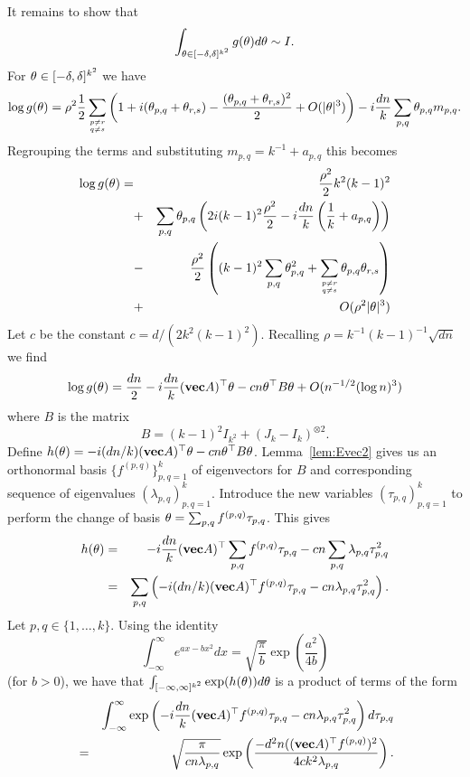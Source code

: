 \documentclass[12pt]{article}
\newcommand{\lab}[1]{\label{#1}}
\def\be{\begin{equation}}
\def\ee{\end{equation}}
\newcommand{\bel}[1]{\be\lab{#1}}
\def\transpose{\top}
\def\mvec{{\bf vec}}
\def\vtheta{{\bf \theta}}
\begin{document}
It remains to show that 
\[
\int_{\vtheta\in [-\delta,\delta]^{k^2}} g(\vtheta) d\vtheta \sim I.
\]
For $\vtheta\in[-\delta,\delta]^{k^2}$ we have
\[
\log g(\vtheta) 
=
\rho^2
\frac{1}{2}
\sum_{p\ne r \atop q\ne s}
\left( 1 + i(\theta_{p,q}+\theta_{r,s}) - \frac{(\theta_{p,q}+\theta_{r,s})^2}{2} + O(|\theta|^3) \right)
- i\frac{dn}{k}\sum_{p,q}\theta_{p,q}m_{p,q}.
\]
Regrouping the terms and substituting $m_{p,q}=k^{-1}+a_{p,q}$ 
this becomes
\begin{eqnarray*}
\log g(\vtheta) 
=&&
\frac{\rho^2}{2}k^2(k-1)^2\\
&+&\sum_{p,q}\theta_{p,q}\left(2i(k-1)^2\frac{\rho^2}{2}-i\frac{dn}{k}\left(\frac{1}{k}+a_{p,q}\right)\right) \\
&-&\frac{\rho^2}{2}\left((k-1)^2\sum_{p,q}\theta_{p,q}^2 + 
\sum_{p\ne r \atop q\ne s}\theta_{p,q}\theta_{r,s}\right)\\
&+& O(\rho^2|\vtheta|^3)
\end{eqnarray*}
Let $c$ be the constant 
$c=d/(2k^2(k-1)^2)$.
Recalling $\rho = k^{-1}(k-1)^{-1}\sqrt{dn}$ 
we find 
\bel{elgg}
\log g(\vtheta) 
=
\frac{dn}{2}
-i\frac{dn}{k}(\mvec A)^\transpose \vtheta
-cn\vtheta^\transpose B \vtheta
+ O(n^{-1/2}(\log n)^3)
\ee
where $B$ is the matrix
\[
B = (k-1)^2 I_{k^2} + (J_k-I_k)^{\otimes 2}.
\]
Define $h(\theta) = -i(dn/k)(\mvec A)^\transpose\vtheta-cn\vtheta^\transpose B\vtheta$.
Lemma~\ref{lem:Evec2} gives us an orthonormal basis $\{f^{(p,q)}\}_{p,q=1}^k$ 
of eigenvectors for $B$ and corresponding sequence of
eigenvalues $(\lambda_{p,q})_{p,q=1}^k$.
 Introduce the new variables $(\tau_{p,q})_{p,q=1}^k$
to perform the change of basis $\vtheta=\sum_{p,q}f^{(p,q)}\tau_{p,q}$. This
gives
\begin{eqnarray*}
h(\vtheta)
&=&
-i\frac{dn}{k}(\mvec A)^\transpose\sum_{p,q}f^{(p,q)} \tau_{p,q}
-cn\sum_{p,q}\lambda_{p,q}\tau_{p,q}^2\\
&=&
\sum_{p,q}\left(
-i(dn/k)(\mvec A)^\transpose f^{(p,q)} \tau_{p,q}
-cn\lambda_{p,q}\tau_{p,q}^2
\right).
\end{eqnarray*}
Let $p,q\in\{1,\ldots,k\}$. 
Using the identity
\[
\int_{-\infty}^\infty e^{ax-bx^2}dx = \sqrt{\frac{\pi}{b}}\exp\left(\frac{a^2}{4b}\right)
\]
(for $b>0$), we have that $\int_{[-\infty,\infty]^{k^2}}
\exp(h(\vtheta)) d\vtheta$ is
a product of terms of the form
\begin{eqnarray*}
&&
\int_{-\infty}^{\infty}\exp\left(
-i\frac{dn}{k}(\mvec A)^\transpose f^{(p,q)} \tau_{p,q}
-cn\lambda_{p,q}\tau_{p,q}^2
\right)d\tau_{p,q}\\
&=&
\sqrt{\frac{\pi}{cn\lambda_{p,q}}}
\exp\left( \frac{-d^2n((\mvec A)^\transpose f^{(p,q)})^2 }
{4ck^2\lambda_{p,q}}  \right).
\end{eqnarray*}
\end{document}
